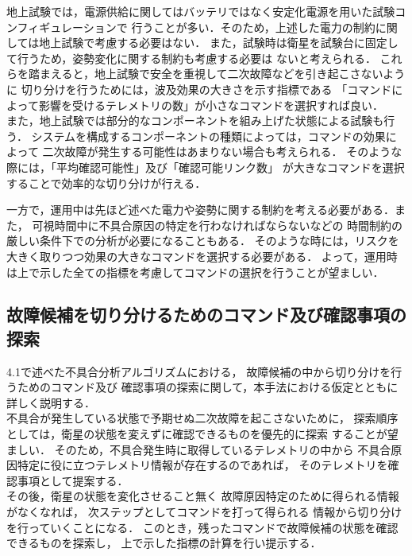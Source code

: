 \documentclass[11pt]{article}
\begin{document}
地上試験では，電源供給に関してはバッテリではなく安定化電源を用いた試験コンフィギュレーションで
行うことが多い．そのため，上述した電力の制約に関しては地上試験で考慮する必要はない．
また，試験時は衛星を試験台に固定して行うため，姿勢変化に関する制約も考慮する必要は
ないと考えられる．
これらを踏まえると，地上試験で安全を重視して二次故障などを引き起こさないように
切り分けを行うためには，波及効果の大きさを示す指標である
「コマンドによって影響を受けるテレメトリの数」が小さなコマンドを選択すれば良い．\\
また，地上試験では部分的なコンポーネントを組み上げた状態による試験も行う．
システムを構成するコンポーネントの種類によっては，コマンドの効果によって
二次故障が発生する可能性はあまりない場合も考えられる．
そのような際には，「平均確認可能性」及び「確認可能リンク数」
が大きなコマンドを選択することで効率的な切り分けが行える．


一方で，運用中は先ほど述べた電力や姿勢に関する制約を考える必要がある．また，
可視時間中に不具合原因の特定を行わなければならないなどの
時間制約の厳しい条件下での分析が必要になることもある．
そのような時には，リスクを大きく取りつつ効果の大きなコマンドを選択する必要がある．
よって，運用時は上で示した全ての指標を考慮してコマンドの選択を行うことが望ましい．

\subsection{故障候補を切り分けるためのコマンド及び確認事項の探索}
4.1で述べた不具合分析アルゴリズムにおける，
故障候補の中から切り分けを行うためのコマンド及び
確認事項の探索に関して，本手法における仮定とともに詳しく説明する．\\
不具合が発生している状態で予期せぬ二次故障を起こさないために，
探索順序としては，衛星の状態を変えずに確認できるものを優先的に探索
することが望ましい．
そのため，不具合発生時に取得しているテレメトリの中から
不具合原因特定に役に立つテレメトリ情報が存在するのであれば，
そのテレメトリを確認事項として提案する．\\
その後，衛星の状態を変化させること無く
故障原因特定のために得られる情報がなくなれば，
次ステップとしてコマンドを打って得られる
情報から切り分けを行っていくことになる．
このとき，残ったコマンドで故障候補の状態を確認できるものを探索し，
上で示した指標の計算を行い提示する．
\end{document}

